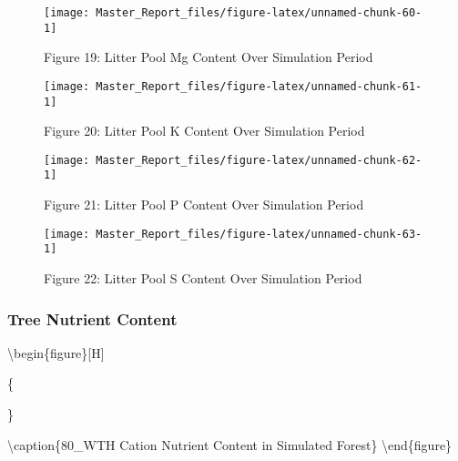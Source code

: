 \documentclass[
]{article}
\begin{document}
\begin{figure}[H]
\texttt{[image: Master\_Report\_files/figure-latex/unnamed-chunk-60-1]} \caption{Figure 19: Litter Pool Mg Content Over Simulation Period}\label{fig:unnamed-chunk-60}
\end{figure}

\begin{figure}[H]
\texttt{[image: Master\_Report\_files/figure-latex/unnamed-chunk-61-1]} \caption{Figure 20: Litter Pool K Content Over Simulation Period}\label{fig:unnamed-chunk-61}
\end{figure}

\begin{figure}[H]
\texttt{[image: Master\_Report\_files/figure-latex/unnamed-chunk-62-1]} \caption{Figure 21: Litter Pool P Content Over Simulation Period}\label{fig:unnamed-chunk-62}
\end{figure}

\begin{figure}[H]
\texttt{[image: Master\_Report\_files/figure-latex/unnamed-chunk-63-1]} \caption{Figure 22: Litter Pool S Content Over Simulation Period}\label{fig:unnamed-chunk-63}
\end{figure}

\hypertarget{tree-nutrient-content-1}{%
\subsubsection{Tree Nutrient Content}\label{tree-nutrient-content-1}}

\textbackslash begin\{figure\}{[}H{]}

\{\centering {}\newline{}

\}

\textbackslash caption\{80\_WTH Cation Nutrient Content in Simulated
Forest\}\label{fig:unnamed-chunk-64} \textbackslash end\{figure\}
\end{document}
